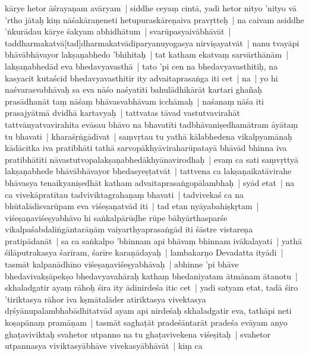\documentclass[article,12pt,a4paper]{memoir}%
\newcounter{parCount}
\begin{document}
kārye hetor āśrayaṇam avāryam | siddhe ceyaṃ cintā, yadi hetor nityo 'nityo vā 'rtho jātaḥ kiṃ nāśakāraṇeneti hetupuraskāreṇaiva pravṛtteḥ | na caivam asiddhe 'ṅkurādau kārye śakyam abhidhātum | svarūpasyaivābhāvāt | taddharmakatvā[tad]dharmakatvādiparyanuyogasya nirviṣayatvāt | \label{thakur75-123.13} nanu tvayāpi bhāvābhāvayor lakṣaṇabhedo 'bhihitaḥ | tat katham ekatvaṃ sarvārthānām | lakṣaṇabhedād eva bhedavyavasthā | tato 'pi cen na bhedavyavasthitiḥ, na kasyacit kutaścid bhedavyavasthitir ity advaitaprasaṅga iti cet | \label{thakur75-123.15} na | yo hi naśvarasvabhāvaḥ sa eva nāśo naśyatīti bahulādhikārāt kartari ghañaḥ prasādhanāt taṃ nāśaṃ bhāvasvabhāvam icchāmaḥ | naśanaṃ nāśa iti prasajyātmā dvidhā kartavyaḥ | tattvatas tāvad vastutvavirahāt tattvānyatvavirahita evāsau bhāvo na bhavatīti tadbhāvaniṣedhamātram āyātaṃ tu bhavati | kharaśṛṅgādivat | saṃvṛtau tu yathā kālabhedena vikalpyamānaḥ kādācitka iva pratibhāti tathā sarvopākhyāviraharūpatayā bhāvād bhinna iva pratibhātīti nāvastutvopalakṣaṇabhedākhyānavirodhaḥ | evaṃ ca sati saṃvṛttyā lakṣaṇabhede bhāvābhāvayor bhedasyeṣṭatvāt | tattvena ca lakṣaṇaikatāvirahe bhāvasya tenaikyaniṣedhāt katham advaitaprasaṅgopālambhaḥ | \label{thakur75-123.24} syād etat | na ca vivekāpratītau tadviviktagrahaṇaṃ bhavati | tadvivekaś ca na bhūtalādisvarūpam eva viśeṣaṇatvād iti | \label{thakur75-123.25} tad etan nyāyabahiṣkṛtam | viśeṣaṇaviśeṣyabhāvo hi saṅkalpārūḍhe rūpe bāhyārthasparśe vikalpaśabdaliṅgāntarāṇāṃ vaiyarthyaprasaṅgād iti śāstre vistareṇa pratipādanāt | sa ca saṅkalpo 'bhinnam api bhāvaṃ bhinnam ivākalayati | yathā śilāputrakasya śarīram, śarīre karaṇādayaḥ | lambakarṇo Devadatta ityādi | tasmāt kalpanādhīno viśeṣaṇaviśeṣyabhāvaḥ | abhinne 'pi bhāve bhedavivakṣāpekṣo bhedavyavahāraḥ kathaṃ bhedaniyatam ātmānam ātanotu | \label{thakur75-123.31} skhaladgatir ayaṃ rāhoḥ śira ity ādinirdeśa itic cet | \label{thakur75-123.31a} yadi satyam etat, tadā śiro 'tiriktasya rāhor iva kṣmātalāder atiriktasya vivektasya dṛśyānupalambhabādhitatvād ayam api nirdeśaḥ skhaladgatir eva, tathāpi neti koṣapānaṃ pramāṇam | tasmāt saghaṭāt pradeśāntarāt pradeśa evāyam anyo ghaṭaviviktaḥ svahetor utpanno na tu ghaṭavivekena viśeṣitaḥ | svahetor utpannasya viviktasyābhāve vivekasyābhāvāt | \label{thakur75-124.3} kiṃ ca
	{}
	\pend%
      
\end{document}
